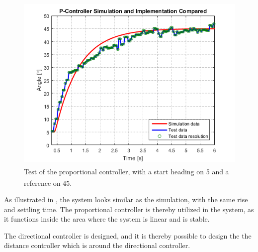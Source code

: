 \begin{figure}[H]
 	\centering
 	\includegraphics[scale=1]{figures/SteeringAngularTest.png}
 	\caption{Test of the proportional controller, with a start heading on \si{5^{\circ}} and a reference on \si{45^{\circ}}.}
 	\label{fig:AngularTestSim}
\end{figure}\vspace{-5mm}
%
As illustrated in , the system looks similar as the simulation, with the same rise and settling time. The proportional controller is thereby utilized in the system, as it functions inside the area where the system is linear and is stable.

The directional controller is designed, and it is thereby possible to design the the distance controller which is around the directional controller.
